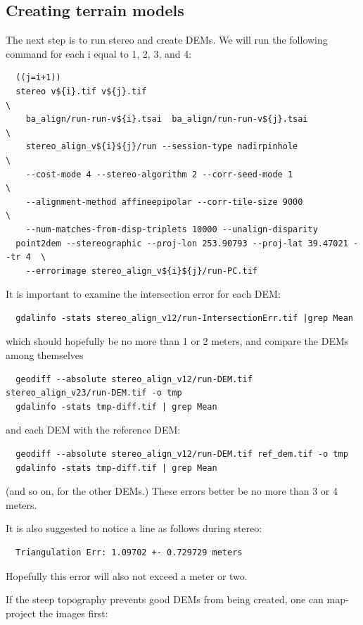 \subsection{Creating terrain models}

The next step is to run stereo and create DEMs. We will run the following command
for each i equal to 1, 2, 3, and 4: 
\begin{verbatim}
  ((j=i+1))
  stereo v${i}.tif v${j}.tif                                                 \
    ba_align/run-run-v${i}.tsai  ba_align/run-run-v${j}.tsai                 \
    stereo_align_v${i}${j}/run --session-type nadirpinhole                   \
    --cost-mode 4 --stereo-algorithm 2 --corr-seed-mode 1                    \
    --alignment-method affineepipolar --corr-tile-size 9000                  \
    --num-matches-from-disp-triplets 10000 --unalign-disparity
  point2dem --stereographic --proj-lon 253.90793 --proj-lat 39.47021 --tr 4  \
    --errorimage stereo_align_v${i}${j}/run-PC.tif
\end{verbatim}

It is important to examine the intersection error for each DEM:
\begin{verbatim}
  gdalinfo -stats stereo_align_v12/run-IntersectionErr.tif |grep Mean
\end{verbatim}

which should hopefully be no more than 1 or 2 meters, and compare the DEMs among themselves
\begin{verbatim}
  geodiff --absolute stereo_align_v12/run-DEM.tif stereo_align_v23/run-DEM.tif -o tmp 
  gdalinfo -stats tmp-diff.tif | grep Mean
\end{verbatim}

and each DEM with the reference DEM:
\begin{verbatim}
  geodiff --absolute stereo_align_v12/run-DEM.tif ref_dem.tif -o tmp 
  gdalinfo -stats tmp-diff.tif | grep Mean
\end{verbatim}

(and so on, for the other DEMs.) These errors better be no more than 3 or 4 meters.

It is also suggested to notice a line as follows during stereo:
\begin{verbatim}
  Triangulation Err: 1.09702 +- 0.729729 meters
\end{verbatim}

Hopefully this error will also not exceed a meter or two. 

If the steep topography prevents good DEMs from being created, one can 
map-project the images first:

